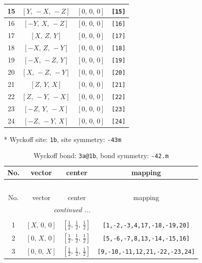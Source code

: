 \documentclass[fleqn,8pt]{jsarticle}
\begin{document}
\begin{longtable}{cccc}
15 & $\left[ Y,\, - X,\, - Z \right]$ & $\left[ 0,\, 0,\, 0 \right]$ & {\tt [15]} \\ \hline
16 & $\left[ - Y,\, X,\, - Z \right]$ & $\left[ 0,\, 0,\, 0 \right]$ & {\tt [16]} \\ \hline
17 & $\left[ X,\, Z,\, Y \right]$ & $\left[ 0,\, 0,\, 0 \right]$ & {\tt [17]} \\ \hline
18 & $\left[ - X,\, Z,\, - Y \right]$ & $\left[ 0,\, 0,\, 0 \right]$ & {\tt [18]} \\ \hline
19 & $\left[ - X,\, - Z,\, Y \right]$ & $\left[ 0,\, 0,\, 0 \right]$ & {\tt [19]} \\ \hline
20 & $\left[ X,\, - Z,\, - Y \right]$ & $\left[ 0,\, 0,\, 0 \right]$ & {\tt [20]} \\ \hline
21 & $\left[ Z,\, Y,\, X \right]$ & $\left[ 0,\, 0,\, 0 \right]$ & {\tt [21]} \\ \hline
22 & $\left[ Z,\, - Y,\, - X \right]$ & $\left[ 0,\, 0,\, 0 \right]$ & {\tt [22]} \\ \hline
23 & $\left[ - Z,\, Y,\, - X \right]$ & $\left[ 0,\, 0,\, 0 \right]$ & {\tt [23]} \\ \hline
24 & $\left[ - Z,\, - Y,\, X \right]$ & $\left[ 0,\, 0,\, 0 \right]$ & {\tt [24]} \\
\end{longtable}
* Wyckoff site: {\tt 1b}, site symmetry: {\tt -43m}
\renewcommand{\arraystretch}{1.2}
\begin{longtable}{cccc}
\caption{Wyckoff bond: {\tt 3a@1b}, bond symmetry: {\tt -42.m}}
 \\
 \hline \hline
No. & vector & center & mapping \\ \hline \endfirsthead

\multicolumn{3}{l}{\tablename\ \thetable{}} \\
 \hline \hline
No. & vector & center & mapping \\ \hline \endhead

 \hline \hline
\multicolumn{3}{r}{\footnotesize\it continued ...} \\ \endfoot

 \hline \hline
\multicolumn{3}{r}{} \\ \endlastfoot

1 & $\left[ X,\, 0,\, 0 \right]$ & $\left[ \frac{1}{2},\, \frac{1}{2},\, \frac{1}{2} \right]$ & {\tt [1,-2,-3,4,17,-18,-19,20]} \\ \hline
2 & $\left[ 0,\, X,\, 0 \right]$ & $\left[ \frac{1}{2},\, \frac{1}{2},\, \frac{1}{2} \right]$ & {\tt [5,-6,-7,8,13,-14,-15,16]} \\ \hline
3 & $\left[ 0,\, 0,\, X \right]$ & $\left[ \frac{1}{2},\, \frac{1}{2},\, \frac{1}{2} \right]$ & {\tt [9,-10,-11,12,21,-22,-23,24]} \\
\end{longtable}
\end{document}
